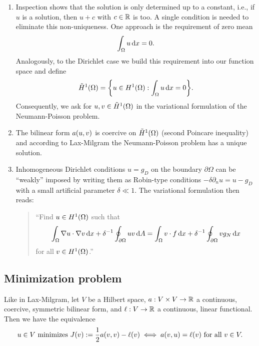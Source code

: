 \begin{remark}
    \begin{enumerate}
        \item Inspection shows that the solution is only determined up to a constant, i.e., if \(u\) is a solution, then \(u + c\) with \(c \in \mathbb{R}\) is too.
        A single condition is needed to eliminate this non-uniqueness.
        One approach is the requirement of zero mean
        \[
            \int_\Omega u\mathop{\mathrm{d}\!} x = 0.
        \]
        Analogously, to the Dirichlet case we build this requirement into our function space and define
        \[
            \tilde{H}^1\parentheses*{\Omega} = \braces*{u \in H^1\parentheses*{\Omega} : \int_\Omega u\d x = 0}.
        \]
        Consequently, we ask for \(u, v \in \tilde{H}^1\parentheses*{\Omega}\) in the variational formulation of the Neumann-Poisson problem.
        \item The bilinear form \(a\parentheses*{u, v}\) is coercive on \(\tilde{H}^1\parentheses*{\Omega}\) (second Poincare inequality) and according to Lax-Milgram the Neumann-Poisson problem has a unique solution.
        \item Inhomogeneous Dirichlet conditions \(u = g_D\) on the boundary \(\partial\Omega\) can be ``weakly'' imposed by writing them as Robin-type conditions \(-\delta\partial_n u = u - g_D\) with a small artificial parameter \(\delta \ll 1\).
        The variational formulation then reads:
        \begin{quote}
            ``Find \(u \in H^1\parentheses*{\Omega}\) such that
            \[
                \int_\Omega \nabla u \cdot \nabla v\mathop{\mathrm{d}\!} x + \delta^{-1}\oint_{\partial\Omega}uv\mathop{\mathrm{d}\!} A = \int_\Omega v \cdot f\mathop{\mathrm{d}\!} x + \delta^{-1}\oint_{\partial\Omega}vg_N\mathop{\mathrm{d}\!} x
            \]
            for all \(v \in H^1\parentheses*{\Omega}\).''
        \end{quote}
    \end{enumerate}
\end{remark}


\subsection{Minimization problem}

\begin{theorem}
    Like in Lax-Milgram, let \(V\) be a Hilbert space, \(a: V \times V \to \mathbb{R}\) a continuous, coercive, symmetric bilinear form, and \(\ell: V \to \mathbb{R}\) a continuous, linear functional.
    Then we have the equivalence
    \[
        u \in V\text{ minimizes }J\parentheses*{v} := \frac{1}{2}a\parentheses*{v, v} - \ell\parentheses*{v} \iff a\parentheses*{v, u} = \ell\parentheses*{v}\text{ for all }v \in V.
    \]
\end{theorem}

